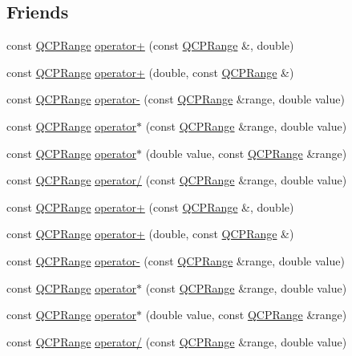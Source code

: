 \subsection*{Friends}
\begin{DoxyCompactItemize}
\item 
const \hyperlink{class_q_c_p_range}{Q\+C\+P\+Range} \hyperlink{class_q_c_p_range_af53ea6fb823a4a5897162b865841de04}{operator+} (const \hyperlink{class_q_c_p_range}{Q\+C\+P\+Range} \&, double)
\item 
const \hyperlink{class_q_c_p_range}{Q\+C\+P\+Range} \hyperlink{class_q_c_p_range_a9fb2e9941d32001482df670c0d704977}{operator+} (double, const \hyperlink{class_q_c_p_range}{Q\+C\+P\+Range} \&)
\item 
const \hyperlink{class_q_c_p_range}{Q\+C\+P\+Range} \hyperlink{class_q_c_p_range_a797f82830b516646da8873f82e39e356}{operator-\/} (const \hyperlink{class_q_c_p_range}{Q\+C\+P\+Range} \&range, double value)
\item 
const \hyperlink{class_q_c_p_range}{Q\+C\+P\+Range} \hyperlink{class_q_c_p_range_a558b1248ff6a9e41fd5b2630555a8acc}{operator$\ast$} (const \hyperlink{class_q_c_p_range}{Q\+C\+P\+Range} \&range, double value)
\item 
const \hyperlink{class_q_c_p_range}{Q\+C\+P\+Range} \hyperlink{class_q_c_p_range_a5cb2332f6957021f47cc768089f4f090}{operator$\ast$} (double value, const \hyperlink{class_q_c_p_range}{Q\+C\+P\+Range} \&range)
\item 
const \hyperlink{class_q_c_p_range}{Q\+C\+P\+Range} \hyperlink{class_q_c_p_range_a4b366a3a21974c88e09b0d39d4a24a4b}{operator/} (const \hyperlink{class_q_c_p_range}{Q\+C\+P\+Range} \&range, double value)
\item 
const \hyperlink{class_q_c_p_range}{Q\+C\+P\+Range} \hyperlink{class_q_c_p_range_af53ea6fb823a4a5897162b865841de04}{operator+} (const \hyperlink{class_q_c_p_range}{Q\+C\+P\+Range} \&, double)
\item 
const \hyperlink{class_q_c_p_range}{Q\+C\+P\+Range} \hyperlink{class_q_c_p_range_a9fb2e9941d32001482df670c0d704977}{operator+} (double, const \hyperlink{class_q_c_p_range}{Q\+C\+P\+Range} \&)
\item 
const \hyperlink{class_q_c_p_range}{Q\+C\+P\+Range} \hyperlink{class_q_c_p_range_a797f82830b516646da8873f82e39e356}{operator-\/} (const \hyperlink{class_q_c_p_range}{Q\+C\+P\+Range} \&range, double value)
\item 
const \hyperlink{class_q_c_p_range}{Q\+C\+P\+Range} \hyperlink{class_q_c_p_range_a558b1248ff6a9e41fd5b2630555a8acc}{operator$\ast$} (const \hyperlink{class_q_c_p_range}{Q\+C\+P\+Range} \&range, double value)
\item 
const \hyperlink{class_q_c_p_range}{Q\+C\+P\+Range} \hyperlink{class_q_c_p_range_a5cb2332f6957021f47cc768089f4f090}{operator$\ast$} (double value, const \hyperlink{class_q_c_p_range}{Q\+C\+P\+Range} \&range)
\item 
const \hyperlink{class_q_c_p_range}{Q\+C\+P\+Range} \hyperlink{class_q_c_p_range_a4b366a3a21974c88e09b0d39d4a24a4b}{operator/} (const \hyperlink{class_q_c_p_range}{Q\+C\+P\+Range} \&range, double value)
\end{DoxyCompactItemize}

